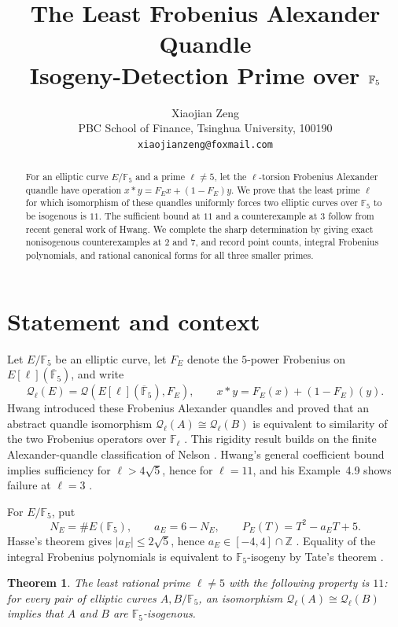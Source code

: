 \documentclass[11pt]{article}
\title{The Least Frobenius Alexander Quandle\\
Isogeny-Detection Prime over $\F_5$}
\author{Xiaojian Zeng\\
PBC School of Finance, Tsinghua University, 100190\\
\texttt{xiaojianzeng@foxmail.com}}
\date{}
\newtheorem{theorem}{Theorem}
\newcommand{\F}{\mathbb F}
\newcommand{\Q}{\mathcal Q}
\begin{document}
\maketitle

\begin{abstract}
For an elliptic curve $E/\F_5$ and a prime $\ell\ne5$, let the
$\ell$-torsion Frobenius Alexander quandle have operation
$x*y=F_E x+(1-F_E)y$.  We prove that the least prime $\ell$ for which
isomorphism of these quandles uniformly forces two elliptic curves over
$\F_5$ to be isogenous is $11$.  The sufficient bound at $11$ and a
counterexample at $3$ follow from recent general work of Hwang.  We complete
the sharp determination by giving exact nonisogenous counterexamples at
$2$ and $7$, and record point counts, integral Frobenius polynomials, and
rational canonical forms for all three smaller primes.
\end{abstract}

\section{Statement and context}

Let $E/\F_5$ be an elliptic curve, let $F_E$ denote the $5$-power
Frobenius on $E[\ell](\overline{\F}_5)$, and write
\[
 \Q_\ell(E)=\Q(E[\ell](\overline{\F}_5),F_E),\qquad
 x*y=F_E(x)+(1-F_E)(y).
\]
Hwang introduced these Frobenius Alexander quandles and proved that an
abstract quandle isomorphism $\Q_\ell(A)\cong\Q_\ell(B)$ is equivalent to
similarity of the two Frobenius operators over $\F_\ell$
\cite[Theorem~4.2 and Corollary~4.3]{Hwang2026}.  This rigidity result builds
on the finite Alexander-quandle classification of Nelson
\cite{Nelson2003}.  Hwang's general coefficient bound implies sufficiency
for $\ell>4\sqrt5$, hence for $\ell=11$, and his Example~4.9 shows failure
at $\ell=3$ \cite[Corollary~4.5 and Example~4.9]{Hwang2026}.

For $E/\F_5$, put
\[
 N_E=\#E(\F_5),\qquad a_E=6-N_E,\qquad
 P_E(T)=T^2-a_ET+5.
\]
Hasse's theorem gives $|a_E|\le 2\sqrt5$, hence $a_E\in[-4,4]\cap\mathbb Z$
\cite{Hasse1936}.  Equality of the integral Frobenius polynomials is
equivalent to $\F_5$-isogeny by Tate's theorem
\cite[Theorem~1(c)]{Tate1966}.

\begin{theorem}\label{thm:main}
The least rational prime $\ell\ne5$ with the following property is $11$:
for every pair of elliptic curves $A,B/\F_5$, an isomorphism
$\Q_\ell(A)\cong\Q_\ell(B)$ implies that $A$ and $B$ are
$\F_5$-isogenous.
\end{theorem}
\end{document}
